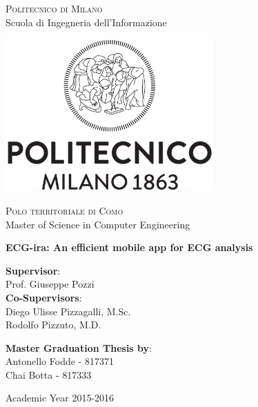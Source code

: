 \thispagestyle{empty}

\begin{center}

	\textsc{Politecnico di Milano}\\
 	Scuola di Ingegneria dell'Informazione\\  

 	\par\vskip 0.2cm

 	\includegraphics[width=8cm]{figures/polimi_logo_bw.png}\\
  
 	\par\vskip 0.2cm  
  
  	\textsc{Polo territoriale di Como}\\
  	Master of Science in Computer Engineering\\  


  	\par\vskip 2cm
  	
\LARGE{ \bf	ECG-ira: An efficient mobile app for ECG analysis}


		
\end{center}

\par\vskip 1.5cm

\begin{flushleft}
\textbf{Supervisor}:\\
Prof. Giuseppe Pozzi\\

\textbf{Co-Supervisors}:\\
Diego Ulisse Pizzagalli, M.Sc.\\
Rodolfo Pizzuto, M.D.
\end{flushleft}

\begin{flushright}
  	\textbf{Master Graduation Thesis by}: \\
  	Antonello Fodde - 817371 \\ 
  	Chai Botta - 817333 \\  
\end{flushright}

\par\vskip 1cm

\begin{center}
 	Academic Year 2015-2016
\end{center}




